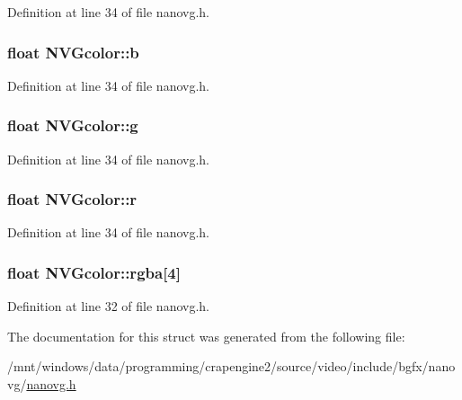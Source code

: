 Definition at line 34 of file nanovg.\+h.

\hypertarget{struct_n_v_gcolor_a61c93a869a5e02b2983b0fc72df4dbb4}{
\subsubsection[{b}]{\setlength{\rightskip}{0pt plus 5cm}float N\+V\+Gcolor\+::b}}\label{struct_n_v_gcolor_a61c93a869a5e02b2983b0fc72df4dbb4}


Definition at line 34 of file nanovg.\+h.

\hypertarget{struct_n_v_gcolor_a03d55a20cd1abd6b1e91f9d7c6c0c29a}{
\subsubsection[{g}]{\setlength{\rightskip}{0pt plus 5cm}float N\+V\+Gcolor\+::g}}\label{struct_n_v_gcolor_a03d55a20cd1abd6b1e91f9d7c6c0c29a}


Definition at line 34 of file nanovg.\+h.

\hypertarget{struct_n_v_gcolor_a5fbafce12dbdd10bdd886aae9157588d}{
\subsubsection[{r}]{\setlength{\rightskip}{0pt plus 5cm}float N\+V\+Gcolor\+::r}}\label{struct_n_v_gcolor_a5fbafce12dbdd10bdd886aae9157588d}


Definition at line 34 of file nanovg.\+h.

\hypertarget{struct_n_v_gcolor_aa1091c72571ef92c4915c1efb6fd1a36}{
\subsubsection[{rgba}]{\setlength{\rightskip}{0pt plus 5cm}float N\+V\+Gcolor\+::rgba\mbox{[}4\mbox{]}}}\label{struct_n_v_gcolor_aa1091c72571ef92c4915c1efb6fd1a36}


Definition at line 32 of file nanovg.\+h.



The documentation for this struct was generated from the following file\+:\begin{DoxyCompactItemize}
\item 
/mnt/windows/data/programming/crapengine2/source/video/include/bgfx/nanovg/\hyperlink{nanovg_8h}{nanovg.\+h}\end{DoxyCompactItemize}
